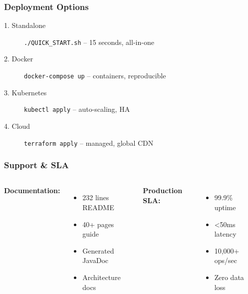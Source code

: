 \documentclass[aspectratio=16:9]{beamer}
\begin{document}
\begin{frame}
  \frametitle{Deployment Options}
  
  \begin{description}
    \item[1. Standalone]
    \texttt{./QUICK\_START.sh}
    -- 15 seconds, all-in-one
    
    \item[2. Docker]
    \texttt{docker-compose up}
    -- containers, reproducible
    
    \item[3. Kubernetes]
    \texttt{kubectl apply}
    -- auto-scaling, HA
    
    \item[4. Cloud]
    \texttt{terraform apply}
    -- managed, global CDN
  \end{description}
\end{frame}

\begin{frame}
  \frametitle{Support \& SLA}
  
  \begin{columns}
    
    \textbf{Documentation:}
    \begin{itemize}
      \item 232 lines README
      \item 40+ pages guide
      \item Generated JavaDoc
      \item Architecture docs
    \end{itemize}
    
    
    \textbf{Production SLA:}
    \begin{itemize}
      \item 99.9\% uptime
      \item <50ms latency
      \item 10,000+ ops/sec
      \item Zero data loss
    \end{itemize}
  \end{columns}
\end{frame}
\end{document}
